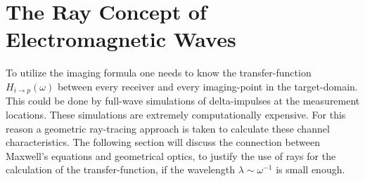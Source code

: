\section{The Ray Concept of Electromagnetic Waves}\label{sec:ray-concept}
To utilize the imaging formula one needs to know the transfer-function \(H_{i\rightarrow p}(\omega)\) between every receiver and every imaging-point in the target-domain.
This could be done by full-wave simulations of delta-impulses at the measurement locations.
These simulations are extremely computationally expensive.
For this reason a geometric ray-tracing approach is taken to calculate these channel characteristics.
The following section will discuss the connection between Maxwell's equations and geometrical optics, to justify the use of rays for the calculation of the transfer-function, if the wavelength \(\lambda \sim \omega^{-1} \) is small enough.


